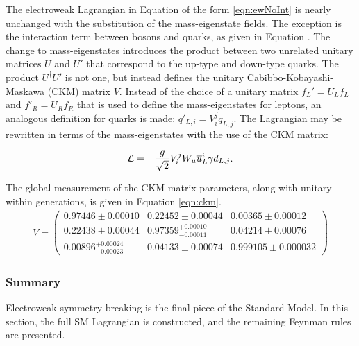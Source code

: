The electroweak Lagrangian in Equation of the form \ref{eqn:ewNoInt} is nearly unchanged with the substitution of the mass-eigenstate fields.
The exception is the interaction term between \W bosons and quarks, as given in Equation \label{eqn:ewLagrangianCc}.
The change to mass-eigenstates introduces the product between two unrelated unitary matrices $U$ and $U'$ that correspond to the up-type and down-type quarks.
The product $U^\dagger U'$ is not one, but instead defines the unitary Cabibbo-Kobayashi-Maskawa (CKM) matrix $V$.
Instead of the choice of a unitary matrix $f_L'=U_Lf_L$ and $f'_R=U_Rf_R$ that is used to define the mass-eigenstates for leptons, an analogous definition for quarks is made: $q'_{L,i}=V_i^jq_{L,j}$.
The Lagrangian may be rewritten in terms of the mass-eigenstates with the use of the CKM matrix:

\begin{equation}\begin{split}
    \mathcal{L}=-\frac{g}{\sqrt{2}}V_i^jW_\mu\overline{u}^i_L\gamma d_{L,j}.
\end{split}\end{equation}

The global measurement of the CKM matrix parameters, along with unitary within generations, is given in Equation \ref{eqn:ckm}. \cite{pdg2019}
\begin{equation}\begin{split}\label{eqn:ckm}
V=
\begin{pmatrix}
0.97446 \pm 0.00010 & 0.22452 \pm 0.00044 & 0.00365 \pm 0.00012 \\
0.22438 \pm 0.00044 & 0.97359^{+0.00010}_{-0.00011} & 0.04214 \pm 0.00076 \\
0.00896^{+0.00024}_{-0.00023} & 0.04133 \pm 0.00074 & 0.999105 \pm 0.000032
\end{pmatrix}
\end{split}\end{equation}


\subsubsection{Summary}

Electroweak symmetry breaking is the final piece of the Standard Model.
In this section, the full SM Lagrangian is constructed, and the remaining Feynman rules are presented.

